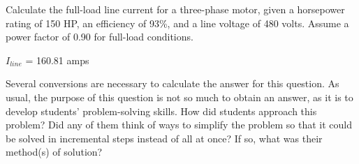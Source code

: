 

Calculate the full-load line current for a three-phase motor, given a horsepower rating of 150 HP, an efficiency of 93\%, and a line voltage of 480 volts.  Assume a power factor of 0.90 for full-load conditions.







$I_{line}$ = 160.81 amps







Several conversions are necessary to calculate the answer for this question.  As usual, the purpose of this question is not so much to obtain an answer, as it is to develop students' problem-solving skills.  How did students approach this problem?  Did any of them think of ways to simplify the problem so that it could be solved in incremental steps instead of all at once?  If so, what was their method(s) of solution?





